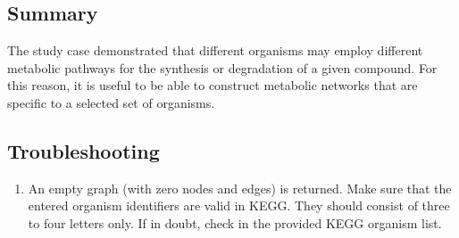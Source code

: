 \subsection{Summary}

The study case demonstrated that different organisms may employ different metabolic pathways for the synthesis or
degradation of a given compound. For this reason, it is useful to be able to construct metabolic networks that are
specific to a selected set of organisms.

\subsection{Troubleshooting}

\begin{enumerate}

\item An empty graph (with zero nodes and edges) is returned.
Make sure that the entered organism identifiers are valid in KEGG.
They should consist of three to four letters only. If in doubt,
check in the provided KEGG organism list.

\end{enumerate}
